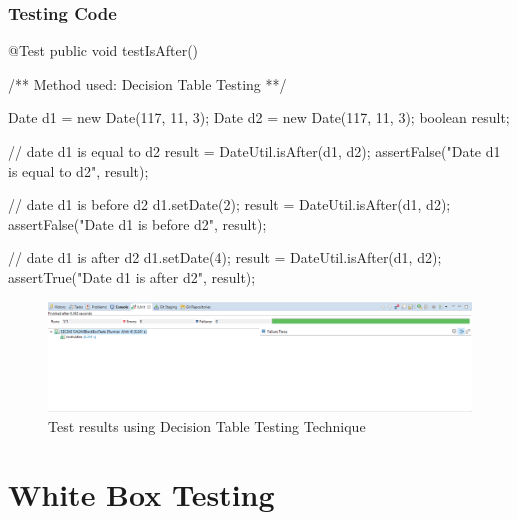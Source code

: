\documentclass[fontsize=12pt,paper=letter,twoside]{scrartcl}
\begin{document}
\newpage
\subsubsection{Testing Code}
\begin{code}
	@Test
	public void testIsAfter() {
		/** Method used: Decision Table Testing **/
		
		Date d1 = new Date(117, 11, 3);
		Date d2 = new Date(117, 11, 3);
		boolean result;
		
		// date d1 is equal to d2
		result = DateUtil.isAfter(d1, d2);
		assertFalse("Date d1 is equal to d2", result);
		
		// date d1 is before d2
		d1.setDate(2);
		result = DateUtil.isAfter(d1, d2);
		assertFalse("Date d1 is before d2", result);
		
		// date d1 is after d2
		d1.setDate(4);
		result = DateUtil.isAfter(d1, d2);
		assertTrue("Date d1 is after d2", result);
	}
\end{code}

\begin{figure}[!htb]
\begin{center}
\includegraphics[width=.99\textwidth]{images/bbt/dtt.png}
\end{center}
\caption{Test results using Decision Table Testing Technique}
\label{fig:bbt_dtt}
\end{figure}

\newpage
\section{White Box Testing}
\end{document}
